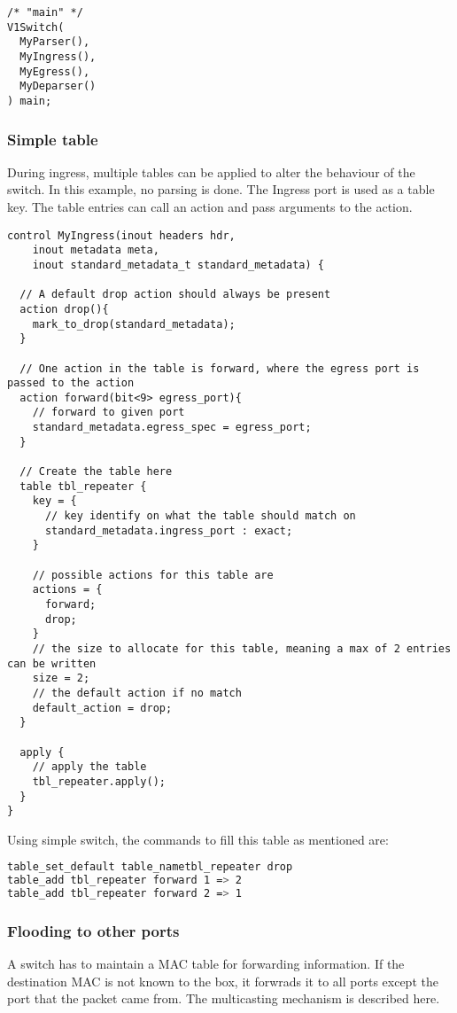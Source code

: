 \documentclass[a4paper, fontsize=8pt, landscape, DIV=1]{scrartcl}
\begin{document}
\begin{multicols*}{3}
\begin{lstlisting}[style=P4style]
/* "main" */
V1Switch(
  MyParser(),
  MyIngress(),
  MyEgress(),
  MyDeparser()
) main;\end{lstlisting}


  \subsubsection{Simple table}
  During ingress, multiple tables can be applied to alter the behaviour of the switch. In this example, no parsing is done. The Ingress port is used as a table key. The table entries can call an action and pass arguments to the action.

  \begin{lstlisting}[style=P4style]
control MyIngress(inout headers hdr,
    inout metadata meta,
    inout standard_metadata_t standard_metadata) {

  // A default drop action should always be present
  action drop(){
    mark_to_drop(standard_metadata);
  }
  
  // One action in the table is forward, where the egress port is passed to the action
  action forward(bit<9> egress_port){
    // forward to given port
    standard_metadata.egress_spec = egress_port;
  }

  // Create the table here
  table tbl_repeater {
    key = {
      // key identify on what the table should match on
      standard_metadata.ingress_port : exact;
    }

    // possible actions for this table are
    actions = {
      forward;
      drop;
    }
    // the size to allocate for this table, meaning a max of 2 entries can be written
    size = 2;
    // the default action if no match
    default_action = drop;
  }

  apply {
    // apply the table
    tbl_repeater.apply();
  }
}\end{lstlisting}

  Using simple switch, the commands to fill this table as mentioned are:

  \begin{lstlisting}[language=bash]
table_set_default table_nametbl_repeater drop
table_add tbl_repeater forward 1 => 2
table_add tbl_repeater forward 2 => 1\end{lstlisting}

  \subsubsection{Flooding to other ports}
  A switch has to maintain a MAC table for forwarding information. If the destination MAC is not known to the box, it forwrads it to all ports except the port that the packet came from. The multicasting mechanism is described here.


\end{multicols*}
\end{document}
